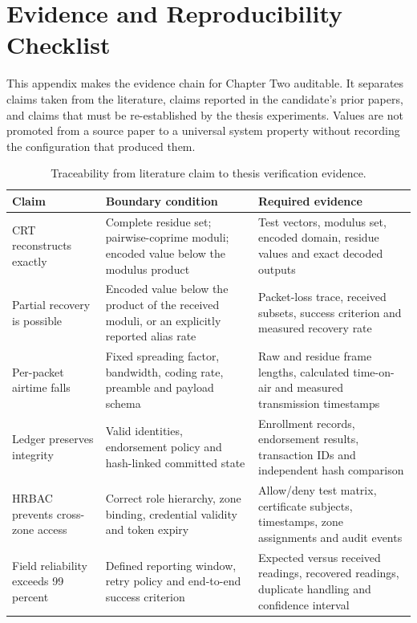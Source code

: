 \documentclass[12pt,a4paper,oneside]{book}
\begin{document}
\chapter{Evidence and Reproducibility Checklist}
\label{app:evidence_checklist}

This appendix makes the evidence chain for Chapter Two auditable. It separates
claims taken from the literature, claims reported in the candidate's prior
papers, and claims that must be re-established by the thesis experiments.
Values are not promoted from a source paper to a universal system property
without recording the configuration that produced them.

\begin{table}[htbp]
\centering
\caption{Traceability from literature claim to thesis verification evidence.}
\label{tab:app-evidence}
\small
\begin{tabularx}{\textwidth}{@{}p{}p{}X@{}}
\toprule
\textbf{Claim} & \textbf{Boundary condition} & \textbf{Required evidence} \\
\midrule
CRT reconstructs exactly & Complete residue set; pairwise-coprime moduli;
encoded value below the modulus product & Test vectors, modulus set, encoded
domain, residue values and exact decoded outputs \\
Partial recovery is possible & Encoded value below the product of the received
moduli, or an explicitly reported alias rate & Packet-loss trace, received
subsets, success criterion and measured recovery rate \\
Per-packet airtime falls & Fixed spreading factor, bandwidth, coding rate,
preamble and payload schema & Raw and residue frame lengths, calculated
time-on-air and measured transmission timestamps \\
Ledger preserves integrity & Valid identities, endorsement policy and
hash-linked committed state & Enrollment records, endorsement results,
transaction IDs and independent hash comparison \\
HRBAC prevents cross-zone access & Correct role hierarchy, zone binding,
credential validity and token expiry & Allow/deny test matrix, certificate
subjects, timestamps, zone assignments and audit events \\
Field reliability exceeds 99 percent & Defined reporting window, retry policy
and end-to-end success criterion & Expected versus received readings, recovered
readings, duplicate handling and confidence interval \\
\bottomrule
\end{tabularx}
\end{table}
\end{document}
